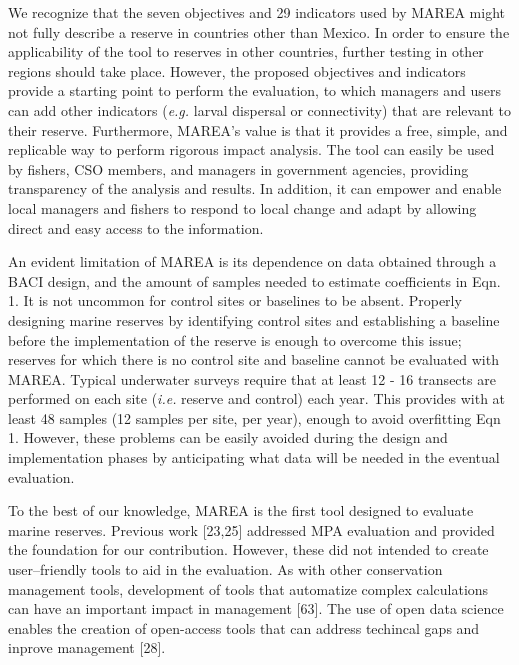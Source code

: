 \documentclass[12pt,]{article}
\begin{document}
We recognize that the seven objectives and 29 indicators used by MAREA
might not fully describe a reserve in countries other than Mexico. In
order to ensure the applicability of the tool to reserves in other
countries, further testing in other regions should take place. However,
the proposed objectives and indicators provide a starting point to
perform the evaluation, to which managers and users can add other
indicators (\emph{e.g.} larval dispersal or connectivity) that are
relevant to their reserve. Furthermore, MAREA's value is that it
provides a free, simple, and replicable way to perform rigorous impact
analysis. The tool can easily be used by fishers, CSO members, and
managers in government agencies, providing transparency of the analysis
and results. In addition, it can empower and enable local managers and
fishers to respond to local change and adapt by allowing direct and easy
access to the information.

An evident limitation of MAREA is its dependence on data obtained
through a BACI design, and the amount of samples needed to estimate
coefficients in Eqn. 1. It is not uncommon for control sites or
baselines to be absent. Properly designing marine reserves by
identifying control sites and establishing a baseline before the
implementation of the reserve is enough to overcome this issue; reserves
for which there is no control site and baseline cannot be evaluated with
MAREA. Typical underwater surveys require that at least 12 - 16
transects are performed on each site (\emph{i.e.} reserve and control)
each year. This provides with at least 48 samples (12 samples per site,
per year), enough to avoid overfitting Eqn 1. However, these problems
can be easily avoided during the design and implementation phases by
anticipating what data will be needed in the eventual evaluation.

To the best of our knowledge, MAREA is the first tool designed to
evaluate marine reserves. Previous work {[}23,25{]} addressed MPA
evaluation and provided the foundation for our contribution. However,
these did not intended to create user--friendly tools to aid in the
evaluation. As with other conservation management tools, development of
tools that automatize complex calculations can have an important impact
in management {[}63{]}. The use of open data science enables the
creation of open-access tools that can address techincal gaps and
inprove management {[}28{]}.
\end{document}
